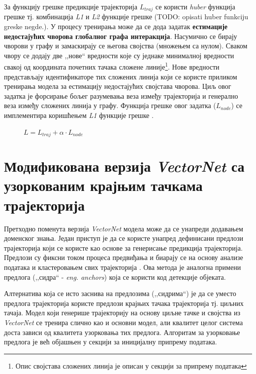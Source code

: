 \documentclass[11pt,oneside]{memoir}
\begin{document}
За функцију грешке предикције трајекторија $L_{traj}$ се користи \textit{huber} функција грешке тј. комбинација \textit{L1} и \textit{L2} функције грешке 
(TODO: opisati huber funkciju greske negde.). 
У процесу тренирања може да се дода задатак \textbf{естимације недостајућих чворова глобалног графа интеракција}. Насумично се бирају чворови у графу и замаскирају
се његова својства (множењем са нулом). Сваком чвору се додају две ,,нове`` вредности које су једнаке минималној вредности свакој од координата почетних 
тачака сложене линије\footnote{Опис својстава сложених линија је описан у секцији за припрему података}. Нове вредности представљају идентификаторе
тих сложених линија који се користе приликом тренирања модела за естимацију недостајућих својстава чворова. Циљ овог задатка је форсирање бољег разумевања
веза између трајекторија и генерално веза између сложених линија у графу. Функција грешке овог задатка ($L_{node}$) се имплементира коришћењем \textit{L1}
функције грешке \cite{vectornet}.

\begin{figure}[H]
  \centering
  $L = L_{traj} + \alpha \cdot L_{node}$
\end{figure}

\section{Модификована верзија \textit{VectorNet} са узоркованим крајњим тачкама трајекторија}

Претходно поменута верзија \textit{VectorNet} модела може да се унапреди додавањем доменског знања. Један приступ је да се користе унапред
дефинисани предлози трајекторија који се користе као основе за генерисање предикција трајекторија. Предлози су фиксни током процеса
предвиђања и биарају се на основу анализе података и кластеровањем свих трајекторија \cite{multipath}.
Ова метода је аналогна примени предлога (,,сидра`` - \textit{eng. anchors}) која се користи код детекције објеката.

Алтернатива која се исто заснива на предлозима (,,сидрима``) је да се уместо предлога трајекторија користе предлози крајњих тачака трајекторија
тј. циљних тачаја. Модел који генерише трајекторију на основу циљне тачке и својства из \textit{VectorNet} се тренира слично као и основни модел, 
али квалитет целог система доста зависи од квалитета узорковања тих предлога. Алгоритам за узорковање предлога је већ објашњен у секцији за
иницијалну припрему података.
\end{document}
